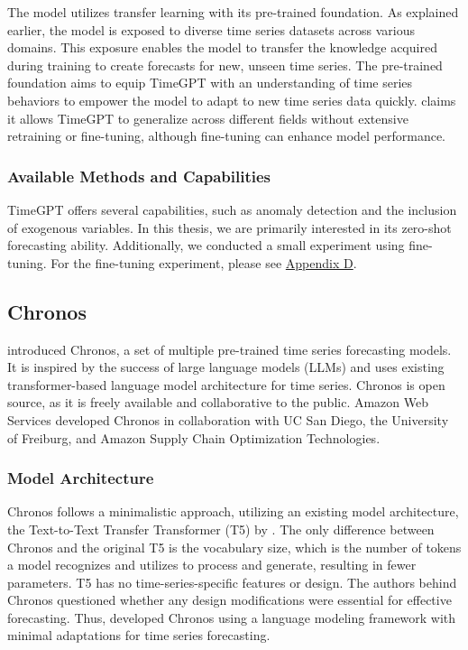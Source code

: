\documentclass[12pt,a4paper]{article}
\begin{document}
The model utilizes transfer learning with its pre-trained foundation. As explained earlier, the model is exposed to diverse time series datasets across various domains. This exposure enables the model to transfer the knowledge acquired during training to create forecasts for new, unseen time series. The pre-trained foundation aims to equip TimeGPT with an understanding of time series behaviors to empower the model to adapt to new time series data quickly. \cite{garza2023timegpt1} claims it allows TimeGPT to generalize across different fields without extensive retraining or fine-tuning, although fine-tuning can enhance model performance.

\subsubsection{Available Methods and Capabilities}

TimeGPT offers several capabilities, such as anomaly detection and the inclusion of exogenous variables. In this thesis, we are primarily interested in its zero-shot forecasting ability. Additionally, we conducted a small experiment using fine-tuning. For the fine-tuning experiment, please see \hyperref[appendix_d]{Appendix D}.

\subsection{Chronos}

\cite{ansari2024chronos} introduced Chronos, a set of multiple pre-trained time series forecasting models. It is inspired by the success of large language models (LLMs) and uses existing transformer-based language model architecture for time series. Chronos is open source, as it is freely available and collaborative to the public. Amazon Web Services developed Chronos in collaboration with UC San Diego, the University of Freiburg, and Amazon Supply Chain Optimization Technologies. 

\subsubsection{Model Architecture}

Chronos follows a minimalistic approach, utilizing an existing model architecture, the Text-to-Text Transfer Transformer (T5) by \cite{Raffel2019}. The only difference between Chronos and the original T5 is the vocabulary size, which is the number of tokens a model recognizes and utilizes to process and generate, resulting in fewer parameters. T5 has no time-series-specific features or design. The authors behind Chronos questioned whether any design modifications were essential for effective forecasting. Thus, \cite{ansari2024chronos} developed Chronos using a language modeling framework with minimal adaptations for time series forecasting.
\end{document}
